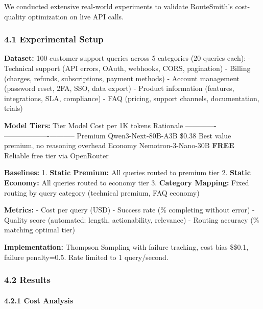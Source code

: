 We conducted extensive real-world experiments to validate RouteSmith's
cost-quality optimization on live API calls.

\hypertarget{experimental-setup-1}{%
\subsubsection{4.1 Experimental Setup}\label{experimental-setup-1}}

\textbf{Dataset:} 100 customer support queries across 5 categories (20
queries each): - Technical support (API errors, OAuth, webhooks, CORS,
pagination) - Billing (charges, refunds, subscriptions, payment methods)
- Account management (password reset, 2FA, SSO, data export) - Product
information (features, integrations, SLA, compliance) - FAQ (pricing,
support channels, documentation, trials)

\textbf{Model Tiers:} \textbar{} Tier \textbar{} Model \textbar{} Cost
per 1K tokens \textbar{} Rationale \textbar{}
\textbar------\textbar-------\textbar-------------------\textbar-----------\textbar{}
\textbar{} Premium \textbar{} Qwen3-Next-80B-A3B \textbar{} \$0.38
\textbar{} Best value premium, no reasoning overhead \textbar{}
\textbar{} Economy \textbar{} Nemotron-3-Nano-30B \textbar{}
\textbf{FREE} \textbar{} Reliable free tier via OpenRouter \textbar{}

\textbf{Baselines:} 1. \textbf{Static Premium:} All queries routed to
premium tier 2. \textbf{Static Economy:} All queries routed to economy
tier 3. \textbf{Category Mapping:} Fixed routing by query category
(technical premium, FAQ economy)

\textbf{Metrics:} - Cost per query (USD) - Success rate (\% completing
without error) - Quality score (automated: length, actionability,
relevance) - Routing accuracy (\% matching optimal tier)

\textbf{Implementation:} Thompson Sampling with failure tracking, cost
bias \$\lambda\$0.1, failure penalty=0.5. Rate limited to 1
query/second.

\hypertarget{results-1}{%
\subsubsection{4.2 Results}\label{results-1}}

\hypertarget{cost-analysis-1}{%
\paragraph{4.2.1 Cost Analysis}\label{cost-analysis-1}}

